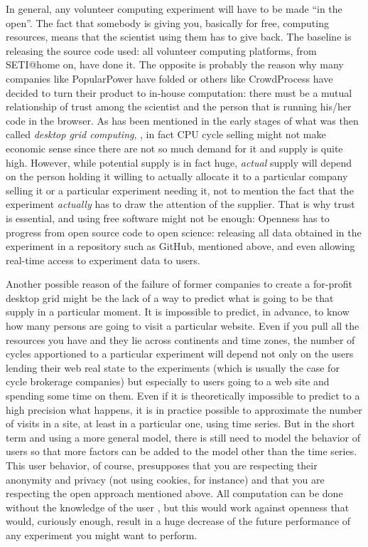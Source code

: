 \documentclass{sig-alternate}
\begin{document}
In general, any volunteer computing experiment will have to be made
``in the open''. The fact that somebody is giving you, basically for
free, computing resources, means that the scientist using them has to
give back. The baseline is releasing the source code used: all
volunteer computing platforms, from SETI@home on, have done it. The
opposite is probably the reason why many companies like PopularPower \cite{buyya2001compute}
have folded or others like CrowdProcess have decided to turn their
product to in-house computation: there must be a mutual relationship
of trust among the scientist and the person that is running his/her
code in the browser. As has been mentioned in the early stages of what
was then called {\em desktop grid computing}, \cite{gc:bausch}, in
fact CPU cycle selling might not make economic sense since there are
not so much demand for it and supply is quite high. However, while
potential supply is in fact huge, {\em actual} supply will depend on
the person holding it willing to actually allocate it to a particular
company selling it or a particular experiment needing it, not to
mention the fact that the experiment {\em actually} has to draw the
attention of the supplier. That is why trust is essential, and using
free software might not be enough: Openness
has to progress from open source code to open science: releasing all
data obtained in the experiment in a repository such as GitHub,
mentioned above, and even allowing real-time access to experiment data
to users.

Another possible reason of the failure of former companies to create a
for-profit desktop grid might be the lack of a way to predict what is
going to be that supply in a particular moment. It is impossible to
predict, in advance, to know how many persons  are going to visit a
particular website. Even if you pull all the resources you have and
they lie across continents and time zones, the number of cycles
apportioned to a particular experiment will depend not only on the
users lending their web real state to the experiments (which is
usually the case for cycle brokerage companies) but especially to
users going to a web site and spending some time on them. Even if it
is theoretically impossible to predict to a high precision what
happens, it is in practice possible to approximate the number of
visits in a site, at least in a particular one, using time series. But
in the short term and using a more general model, there is still need
to model the behavior of users so that more factors can be added to
the model other than the time series. This user behavior, of course,
presupposes that you are respecting their anonymity and privacy (not using
cookies, for instance) and that you are respecting the open approach
mentioned above. All computation can be done without the knowledge of
the user \cite{unwitting-ec}, but this would work against openness
that would, curiously enough, result in a huge decrease of the future
performance of any experiment you might want to perform. 
\end{document}
